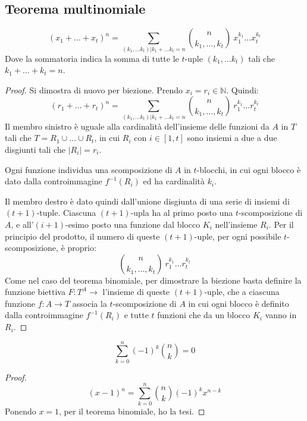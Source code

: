 \subsection{Teorema multinomiale}
\begin{prop}
\begin{equation}
(x_1 + \dots + x_t)^n = \sum_{(k_1, \dots k_t) | k_1 + \dots k_t = n}
\binom{n}{k_1, \dots, k_t} \ x_1^{k_1} \dots x_t^{k_t}
\end{equation}
Dove la sommatoria indica la somma di tutte le $t$-uple $(k_1, \dots k_t)$ tali che $k_1 + \dots + k_t = n$.
\end{prop}
\begin{proof}
Si dimostra di nuovo per biezione. Prendo $x_i = r_i \in \mathbb{N}$. Quindi:
\[
(r_1 + \dots + r_t)^n = \sum_{(k_1, \dots k_t) | k_1 + \dots k_t = n}
\binom{n}{k_1, \dots, k_t} \ r_1^{k_1} \dots r_t^{k_t}
\]
Il membro sinistro \`e uguale alla cardinalit\`a dell'insieme delle funzioni da $A$ in $T$ tali che $T = R_1 \cup \dots \cup R_t$, in cui $R_i $ con $i \in [1, t]$ sono insiemi a due a due disgiunti tali che $| R_i | = r_i$.

Ogni funzione individua una scomposizione di $A$ in $t$-blocchi, in cui ogni blocco \`e dato dalla controimmagine $f^{-1} (R_i)$ ed ha cardinalit\`a $k_i$. 

Il membro destro \`e dato quindi dall'unione disgiunta di una serie di insiemi di $(t+1)$-tuple. Ciascuna $(t+1)$-upla ha al primo posto una $t$-scomposizione di $A$, e all'$(i+1)$-esimo posto una funzione dal blocco $K_i$ nell'insieme $R_i$. Per il principio del prodotto, il numero di queste $(t+1)$-uple, per ogni possibile $t$-scomposizione, \`e proprio:
\[
\binom{n}{k_1, \dots, k_t} \ r_1^{k_1} \dots r_t^{k_t}
\]
Come nel caso del teorema binomiale, per dimostrare la biezione basta definire la funzione biettiva $F : T^A \to$ l'insieme di queste $(t+1)$-uple, che a ciascuna funzione $f : A \to T$ associa la $t$-scomposizione di $A$ in cui ogni blocco \`e definito dalla controimmagine $f^{-1} (R_i)$ e tutte $t$ funzioni che da un blocco $K_i$ vanno in $R_i$.
\end{proof}

\begin{cor}
\[
\sum_{k = 0}^{n} (-1)^k \binom{n}{k} = 0
\]
\end{cor}
\begin{proof}
\[
(x - 1)^n = \sum_{k = 0}^{n} \binom{n}{k} (-1)^k x^{n-k}
\]
Ponendo $x = 1$, per il teorema binomiale, ho la tesi.
\end{proof}

